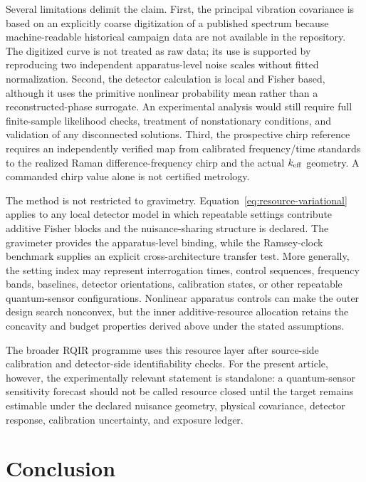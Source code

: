 Several limitations delimit the claim. First, the principal vibration covariance is based on an explicitly coarse digitization of a published spectrum because machine-readable historical campaign data are not available in the repository. The digitized curve is not treated as raw data; its use is supported by reproducing two independent apparatus-level noise scales without fitted normalization. Second, the detector calculation is local and Fisher based, although it uses the primitive nonlinear probability mean rather than a reconstructed-phase surrogate. An experimental analysis would still require full finite-sample likelihood checks, treatment of nonstationary conditions, and validation of any disconnected solutions. Third, the prospective chirp reference requires an independently verified map from calibrated frequency/time standards to the realized Raman difference-frequency chirp and the actual $k_{\rm eff}$ geometry. A commanded chirp value alone is not certified metrology.

The method is not restricted to gravimetry. Equation~\eqref{eq:resource-variational} applies to any local detector model in which repeatable settings contribute additive Fisher blocks and the nuisance-sharing structure is declared. The gravimeter provides the apparatus-level binding, while the Ramsey-clock benchmark supplies an explicit cross-architecture transfer test. More generally, the setting index may represent interrogation times, control sequences, frequency bands, baselines, detector orientations, calibration states, or other repeatable quantum-sensor configurations. Nonlinear apparatus controls can make the outer design search nonconvex, but the inner additive-resource allocation retains the concavity and budget properties derived above under the stated assumptions.

The broader RQIR programme uses this resource layer after source-side calibration and detector-side identifiability checks. For the present article, however, the experimentally relevant statement is standalone: a quantum-sensor sensitivity forecast should not be called resource closed until the target remains estimable under the declared nuisance geometry, physical covariance, detector response, calibration uncertainty, and exposure ledger.

\section{Conclusion}
\label{sec:conclusion}

